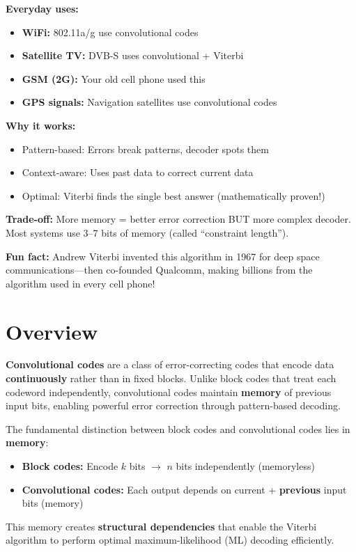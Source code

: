 \begin{nontechnical}
\textbf{Everyday uses:}
\begin{itemize}
\item \textbf{WiFi:} 802.11a/g use convolutional codes
\item \textbf{Satellite TV:} DVB-S uses convolutional + Viterbi
\item \textbf{GSM (2G):} Your old cell phone used this
\item \textbf{GPS signals:} Navigation satellites use convolutional codes
\end{itemize}

\textbf{Why it works:}
\begin{itemize}
\item Pattern-based: Errors break patterns, decoder spots them
\item Context-aware: Uses past data to correct current data
\item Optimal: Viterbi finds the single best answer (mathematically proven!)
\end{itemize}

\textbf{Trade-off:} More memory = better error correction BUT more complex decoder. Most systems use 3--7 bits of memory (called ``constraint length'').

\textbf{Fun fact:} Andrew Viterbi invented this algorithm in 1967 for deep space communications---then co-founded Qualcomm, making billions from the algorithm used in every cell phone!
\end{nontechnical}

\section{Overview}

\textbf{Convolutional codes} are a class of error-correcting codes that encode data \textbf{continuously} rather than in fixed blocks. Unlike block codes that treat each codeword independently, convolutional codes maintain \textbf{memory} of previous input bits, enabling powerful error correction through pattern-based decoding.

\begin{keyconcept}
The fundamental distinction between block codes and convolutional codes lies in \textbf{memory}:
\begin{itemize}
\item \textbf{Block codes:} Encode $k$ bits $\rightarrow$ $n$ bits independently (memoryless)
\item \textbf{Convolutional codes:} Each output depends on current + \textbf{previous} input bits (memory)
\end{itemize}

This memory creates \textbf{structural dependencies} that enable the Viterbi algorithm to perform optimal maximum-likelihood (ML) decoding efficiently.
\end{keyconcept}


